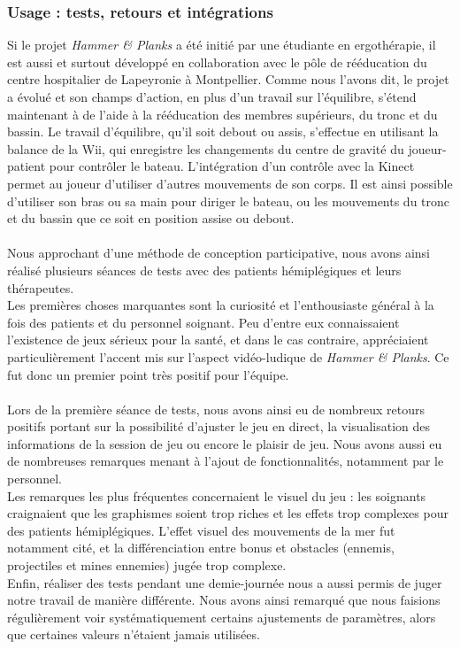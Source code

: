 	\subsubsection*{Usage : tests, retours et intégrations}
Si le projet \emph{Hammer \& Planks} a été initié par une étudiante en ergothérapie, il est aussi et surtout développé en collaboration avec le pôle de rééducation du centre hospitalier de Lapeyronie à Montpellier. Comme nous l'avons dit, le projet a évolué et son champs d'action, en plus d'un travail sur l'équilibre, s'étend maintenant à de l'aide à la rééducation des membres supérieurs, du tronc et du bassin. Le travail d'équilibre, qu'il soit debout ou assis, s'effectue en utilisant la balance de la Wii, qui enregistre les changements du centre de gravité du joueur-patient pour contrôler le bateau. L'intégration d'un contrôle avec la Kinect permet au joueur d'utiliser d'autres mouvements de son corps. Il est ainsi possible d'utiliser son bras ou sa main pour diriger le bateau, ou les mouvements du tronc et du bassin que ce soit en position assise ou debout.

\paragraph{} Nous approchant d'une méthode de conception participative, nous avons ainsi réalisé plusieurs séances de tests avec des patients hémiplégiques et leurs thérapeutes. \\
Les premières choses marquantes sont la curiosité et l'enthousiaste général à la fois des patients et du personnel soignant. Peu d'entre eux connaissaient l'existence de jeux sérieux pour la santé, et dans le cas contraire, appréciaient particulièrement l'accent mis sur l'aspect vidéo-ludique de \emph{Hammer \& Planks}. Ce fut donc un premier point très positif pour l'équipe.

\paragraph{} 
Lors de la première séance de tests, nous avons ainsi eu de nombreux retours positifs portant sur la possibilité d'ajuster le jeu en direct, la visualisation des informations de la session de jeu ou encore le plaisir de jeu. Nous avons aussi eu de nombreuses remarques menant à l'ajout de fonctionnalités, notamment par le personnel.\\
Les remarques les plus fréquentes concernaient le visuel du jeu : les soignants craignaient que les graphismes soient trop riches et les effets trop complexes pour des patients hémiplégiques. L'effet visuel des mouvements de la mer fut notamment cité, et la différenciation entre bonus et obstacles (ennemis, projectiles et mines ennemies) jugée trop complexe.\\
Enfin, réaliser des tests pendant une demie-journée nous a aussi permis de juger notre travail de manière différente. Nous avons ainsi remarqué que nous faisions régulièrement voir systématiquement certains ajustements de paramètres, alors que certaines valeurs n'étaient jamais utilisées.


